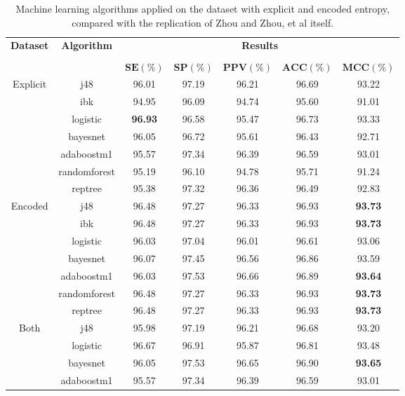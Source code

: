 \begin{table}[h]
\begin{center}
\begin{threeparttable}
\caption{Machine learning algorithms applied on the dataset with explicit and encoded entropy, compared with the replication of Zhou and Zhou, et al \cite{zhou2015} itself.}
\label{table:zhou_unimol_explicit_encoded}
\scriptsize
  \begin{tabular}{c c c c c c c}
  \toprule
  \textbf{Dataset} & \textbf{Algorithm} & \multicolumn{5}{c}{\textbf{Results}} \\
  \cline{3-7}
  \\
  & & $\mathbf{SE(\%)}$ & $\mathbf{SP(\%)}$ & $\mathbf{PPV(\%)}$ & $\mathbf{ACC(\%)}$ & $\mathbf{MCC(\%)}$\\
  \midrule  
  Explicit & j48 & 96.01 & 97.19 & 96.21 & 96.69 & 93.22 \\
  & ibk & 94.95 & 96.09 & 94.74 & 95.60 & 91.01 \\
  & logistic & \textbf{96.93} & 96.58 & 95.47 & 96.73 & 93.33 \\
  & bayesnet & 96.05 & 96.72 & 95.61 & 96.43 & 92.71 \\
  & adaboostm1 & 95.57 & 97.34 & 96.39 & 96.59 & 93.01 \\
  & randomforest & 95.19 & 96.10 & 94.78 & 95.71 & 91.24 \\
  & reptree & 95.38 & 97.32 & 96.36 & 96.49 & 92.83 \\
  \hline
  Encoded & j48 &  96.48 &  97.27 &  96.33 &  96.93 &  \textbf{93.73} \\
  & ibk &  96.48 &  97.27 &  96.33 &  96.93 &  \textbf{93.73} \\
  & logistic &  96.03 &  97.04 &  96.01 &  96.61 &  93.06 \\
  & bayesnet &  96.07 &  97.45 &  96.56 &  96.86 &  93.59 \\
  & adaboostm1 &  96.03 &  97.53 &  96.66 &  96.89 &  \textbf{93.64} \\
  & randomforest & 96.48 &  97.27 &  96.33 &  96.93 &  \textbf{93.73} \\
  & reptree & 96.48 &  97.27 &  96.33 &  96.93 &  \textbf{93.73} \\
  \hline
  Both & j48 & 95.98 & 97.19 & 96.21 & 96.68 & 93.20 \\
  & logistic & 96.67 & 96.91 & 95.87 & 96.81 & 93.48 \\
  & bayesnet & 96.05 & 97.53 & 96.65 & 96.90 & \textbf{93.65} \\
  & adaboostm1 & 95.57 & 97.34 & 96.39 & 96.59 & 93.01 \\

\end{tabular}
\end{threeparttable}
\end{center}
\end{table}
